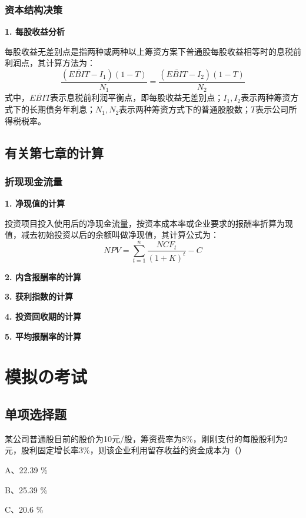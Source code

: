 \documentclass[
  10pt,
  twoside,
  openany,
  b5paper, %
  colorscheme = black, %
  xits = false,
]{qyxf-book}
\begin{document}
\subsection{资本结构决策}

\textbf{1. 每股收益分析}

每股收益无差别点是指两种或两种以上筹资方案下普通股每股收益相等时的息税前利润点，其计算方法为：
\begin{equation*}
	\frac{(\overline{EBIT}-I_1)(1-T)}{N_1}= \frac{(\overline{EBIT}-I_2)(1-T)}{N_2}
\end{equation*}
式中，$\overline{EBIT}$表示息税前利润平衡点，即每股收益无差别点；$I_1,I_2$表示两种筹资方式下的长期债务年利息；$N_1,N_2$表示两种筹资方式下的普通股股数；$T$表示公司所得税税率。

\newpage

\section{有关第七章的计算}

\subsection{折现现金流量}

\textbf{1. 净现值的计算}

投资项目投入使用后的净现金流量，按资本成本率或企业要求的报酬率折算为现值，减去初始投资以后的余额叫做净现值，其计算公式为：
\begin{equation*}
	NPV = \sum_{t=1}^{n} \frac{NCF_t}{(1+K)^t}-C
\end{equation*}

\textbf{2. 内含报酬率的计算}

\textbf{3. 获利指数的计算}

\textbf{4. 投资回收期的计算}

\textbf{5. 平均报酬率的计算}
\chapter{模拟の考试}
\section{单项选择题}
 某公司普通股目前的股价为10元/股，筹资费率为8\%，刚刚支付的每股股利为2元，股利固定增长率3\%，则该企业利用留存收益的资金成本为（\qquad）

A、22.39 \%

B、25.39 \%

C、20.6 \%
\end{document}
